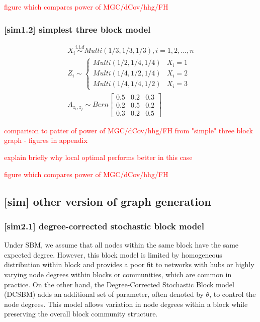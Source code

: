 \documentclass[12pt]{article}
\theoremstyle{definition}
\begin{document}
\textcolor{red}{figure which compares power of MGC/dCov/hhg/FH}



\subsubsection{[sim1.2] simplest three block model}


\begin{equation}
\begin{gathered}
X_{i} \overset{i.i.d}{\sim} Multi(1/3, 1/3, 1/3), i = 1,2, ... , n \\ 
Z_{i}  \sim  \left\{  \begin{array}{ccc} Multi(1/2, 1/4, 1/4) & X_{i} = 1 \\ Multi(1/4, 1/2, 1/4) & X_{i} = 2 \\ Multi(1/4, 1/4, 1/2) & X_{i} = 3  \end{array} \right. \\
A_{z_{i}, z_{j}} \sim Bern \left[  \begin{array}{ccc}   0.5 & 0.2 &  0.3  \\ 0.2 & 0.5 & 0. 2  \\ 0.3 & 0.2 & 0.5  \end{array}  \right]
\end{gathered}
\end{equation}

\textcolor{red}{comparison to patter of power of MGC/dCov/hhg/FH from "simple" three block graph - figures in appendix}


\textcolor{red}{explain briefly why local optimal performs better in this case}


\textcolor{red}{figure which compares power of MGC/dCov/hhg/FH}



\subsection{[sim] other version of graph generation}


\subsubsection{[sim2.1] degree-corrected stochastic block model}

Under SBM, we assume that all nodes within the same block have the same expected degree. However, this block model is limited by homogeneous distribution within block and provides a poor fit to networks with hubs or highly varying node degrees within blocks or communities, which are common in practice. On the other hand, the Degree-Corrected Stochastic Block model (DCSBM) adds an additional set of parameter, often denoted by $\theta$, to control the node degrees. This model allows variation in node degrees within a block while preserving the overall block community structure. 
\end{document}
